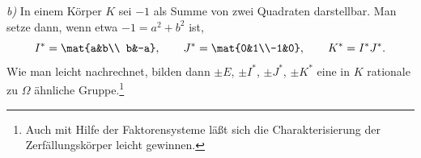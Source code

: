 \emph{b)} In einem Körper $K$ sei $-1$ als Summe von zwei Quadraten darstellbar. Man setze dann, wenn etwa $-1=a^2+b^2$ ist,
\[
        I^*=\mat{a&b\\ b&-a},\qquad
        J^*=\mat{0&1\\-1&0},\qquad
        K^*=I^*J^*.
\]
Wie man leicht nachrechnet, bilden dann $\pm E$, $\pm I^*$, $\pm J^*$, $\pm K^*$ eine in $K$ rationale zu $\Omega$ ähnliche Gruppe.\footnote{Auch mit Hilfe der Faktorensysteme läßt sich die Charakterisierung der Zerfällungskörper leicht gewinnen.}
